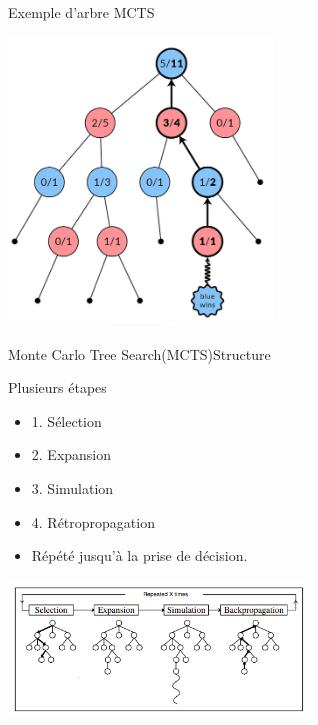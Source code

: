 \begin{frame}
	\begin{block}{Exemple d'arbre MCTS}
		\begin{center}
			\includegraphics[width=7cm]{ressources/MCTS/tree.png}
		\end{center}
	\end{block}
\end{frame}


\begin{frame}{Monte Carlo Tree Search(MCTS)}{Structure}
    \begin{block}{Plusieurs étapes}
	    	\begin{itemize}
	    		\item 1. Sélection
	    		\item 2. Expansion
	    		\item 3. Simulation
	    		\item 4. Rétropropagation
	    		\item Répété jusqu'à la prise de décision.
	    	\end{itemize}
		\begin{center}
			\includegraphics[width=8cm]{ressources/MCTS/MCTSEtapes}
		\end{center}
	\end{block}
\end{frame}

